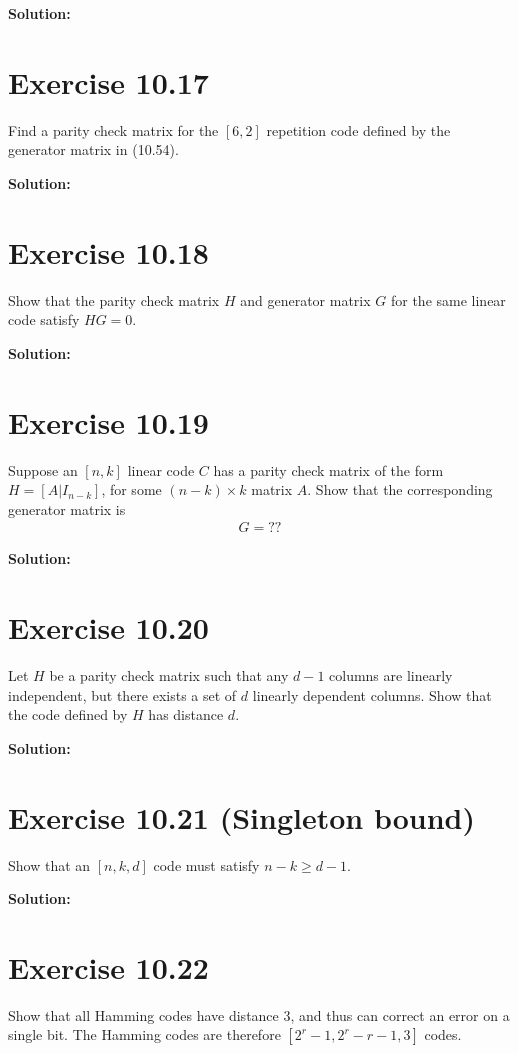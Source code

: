 \documentclass{book}
\begin{document}
    \textbf{Solution:}

\section*{Exercise 10.17}
    Find a parity check matrix for the $[6,2]$ repetition code defined by the generator matrix in (10.54). 

    \textbf{Solution:}

\section*{Exercise 10.18}
    Show that the parity check matrix $H$ and generator matrix $G$ for the same linear code satisfy $HG = 0$. 

    \textbf{Solution:}

\section*{Exercise 10.19}
    Suppose an $[n,k]$ linear code $C$ has a parity check matrix of the form $H = [A\vert I_{n-k}]$, for some $(n-k)\times k$ matrix $A$. Show that the corresponding generator matrix is
    \begin{align}
        G = ??
    \end{align}

    \textbf{Solution:}

\section*{Exercise 10.20}
    Let $H$ be a parity check matrix such that any $d - 1$ columns are linearly independent, but there exists a set of $d$ linearly dependent columns. Show that the code defined by $H$ has distance $d$. 

    \textbf{Solution:}

\section*{Exercise 10.21 (Singleton bound)}
    Show that an $[n, k, d]$ code must satisfy $n-k \geq d-1$. 

    \textbf{Solution:}

\section*{Exercise 10.22}
    Show that all Hamming codes have distance 3, and thus can correct an error on a single bit. The Hamming codes are therefore $[2^r - 1, 2^r - r - 1, 3]$ codes. 
    
\end{document}
